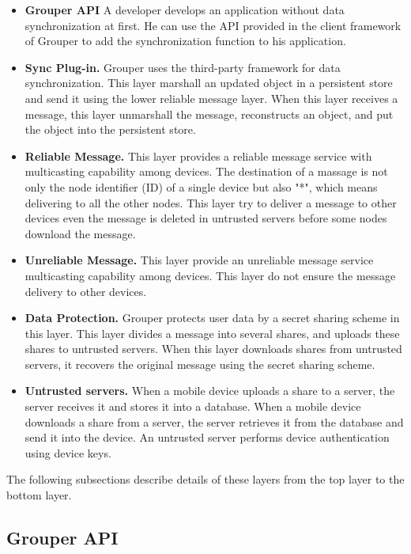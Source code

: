 \documentclass[twocolumn,10pt]{article}
\begin{document}
\begin{itemize}
	\setlength{\itemsep}{1pt}
	\setlength{\parskip}{0pt}
	\setlength{\parsep}{0pt}
	\item \textbf{Grouper API}
	A developer develops an application without data synchronization at first. 
	He can use the API provided in the client framework of Grouper to add the synchronization function to his application.
	\item \textbf{Sync Plug-in.} 
	Grouper uses the third-party framework for data synchronization.
	This layer marshall an updated object in a persistent store and send it using the lower reliable message layer.
	When this layer receives a message, this layer unmarshall the message, reconstructs an object, and put the object into the persistent store.
	\item \textbf{Reliable Message.}
	This layer provides a reliable message service with multicasting capability among devices.
	The destination of a massage is not only the node identifier (ID) of a single device but also "*", which means delivering to all the other nodes.
	This layer try to deliver a message to other devices even the message is deleted in untrusted servers before some nodes download the message.
	\item \textbf{Unreliable Message.}
	This layer provide an unreliable message service multicasting capability among devices.
	This layer do not ensure the message delivery to other devices.
	\item \textbf{Data Protection.}
	Grouper protects user data by a secret sharing scheme in this layer.
	This layer divides a message into several shares, and uploads these shares to untrusted servers.
	When this layer downloads shares from untrusted servers, it recovers the original message using the secret sharing scheme.
	\item \textbf{Untrusted servers.}
	When a mobile device uploads a share to a server, the server receives it and stores it into a database.
	When a mobile device downloads a share from a server, the server retrieves it from the database and send it into the device.
	An untrusted server performs device authentication using device keys.
\end{itemize}

The following subsections describe details of these layers from the top layer to the bottom layer.

\subsection{Grouper API}
\end{document}
